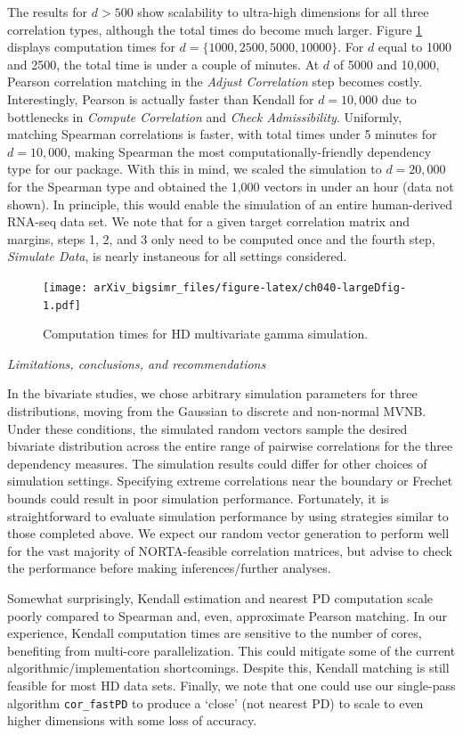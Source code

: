 \documentclass{article}
\begin{document}
The results for \(d > 500\) show scalability to ultra-high dimensions
for all three correlation types, although the total times do become much
larger. Figure \ref{fig:ch040-largeDfig} displays computation times for
\(d=\{1000, 2500, 5000, 10000\}\). For \(d\) equal to 1000 and 2500, the
total time is under a couple of minutes. At \(d\) of 5000 and 10,000,
Pearson correlation matching in the \emph{Adjust Correlation} step
becomes costly. Interestingly, Pearson is actually faster than Kendall
for \(d=10,000\) due to bottlenecks in \emph{Compute Correlation} and
\emph{Check Admissibility}. Uniformly, matching Spearman correlations is
faster, with total times under 5 minutes for \(d=10,000\), making
Spearman the most computationally-friendly dependency type for our
package. With this in mind, we scaled the simulation to \(d=20,000\) for
the Spearman type and obtained the 1,000 vectors in under an hour (data
not shown). In principle, this would enable the simulation of an entire
human-derived RNA-seq data set. We note that for a given target
correlation matrix and margins, steps 1, 2, and 3 only need to be
computed once and the fourth step, \emph{Simulate Data}, is nearly
instaneous for all settings considered.

\begin{figure}
\centering
\texttt{[image: arXiv\_bigsimr\_files/figure-latex/ch040-largeDfig-1.pdf]}
\caption{\label{fig:ch040-largeDfig}Computation times for HD
multivariate gamma simulation.}
\end{figure}

\emph{Limitations, conclusions, and recommendations}

In the bivariate studies, we chose arbitrary simulation parameters for
three distributions, moving from the Gaussian to discrete and non-normal
MVNB. Under these conditions, the simulated random vectors sample the
desired bivariate distribution across the entire range of pairwise
correlations for the three dependency measures. The simulation results
could differ for other choices of simulation settings. Specifying
extreme correlations near the boundary or Frechet bounds could result in
poor simulation performance. Fortunately, it is straightforward to
evaluate simulation performance by using strategies similar to those
completed above. We expect our random vector generation to perform well
for the vast majority of NORTA-feasible correlation matrices, but advise
to check the performance before making inferences/further analyses.

Somewhat surprisingly, Kendall estimation and nearest PD computation
scale poorly compared to Spearman and, even, approximate Pearson
matching. In our experience, Kendall computation times are sensitive to
the number of cores, benefiting from multi-core parallelization. This
could mitigate some of the current algorithmic/implementation
shortcomings. Despite this, Kendall matching is still feasible for most
HD data sets. Finally, we note that one could use our single-pass
algorithm \texttt{cor\_fastPD} to produce a `close' (not nearest PD) to
scale to even higher dimensions with some loss of accuracy.
\end{document}
